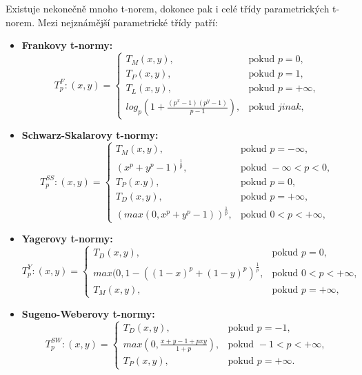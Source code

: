 Existuje nekone\v cn\v e mnoho t-norem, dokonce pak i cel\'e t\v r\'idy parametrick\' ych  t-norem. Mezi nejzn\' am\v ej\v s\' i parametrické třídy patří:
\begin{itemize}
    \item \textbf{Frankovy t-normy:}
    $$T_p^F:(x,y)=\begin{cases} T_M(x,y), & \mbox{pokud }  p = 0,\\ 
                                T_P(x,y), & \mbox{pokud } p = 1,\\
                                T_L(x,y), & \mbox{pokud } p = +\infty,\\
                                log_p(1+\frac{(p^x-1)(p^y-1)}{p-1}), & \mbox{pokud } jinak, 
                                \end{cases}$$
    \item \textbf{Schwarz-Skalarovy t-normy:}
    $$T_p^{SS}:(x,y)=\begin{cases} T_M(x,y), & \mbox{pokud }  p = -\infty,\\ 
                                (x^p+y^p-1)^\frac{1}{p}, & \mbox{pokud }  -\infty < p < 0,\\ 
                                T_P(x.y), & \mbox{pokud } p = 0,\\
                                T_D(x,y), & \mbox{pokud } p = +\infty,\\
                                (max(0, x^p+y^p-1))^\frac{1}{p}, & \mbox{pokud } 0 < p < +\infty, \end{cases}$$
    \item \textbf{Yagerovy t-normy:}
    $$T_p^Y:(x,y)=\begin{cases}  T_D(x,y), & \mbox{pokud } p = 0,\\
                                max(0,1-((1-x)^p+(1-y)^p)^\frac{1}{p} , & \mbox{pokud } 0 < p < +\infty,\\
                                T_M(x,y), & \mbox{pokud } p = +\infty,
                                \end{cases}$$
    \item \textbf{Sugeno-Weberovy t-normy:}
    $$T_p^{SW}:(x,y)=\begin{cases}  T_D(x,y), & \mbox{pokud } p = -1,\\
                                    max(0,\frac{x+y-1+pxy}{1+p}) , & \mbox{pokud } -1 < p < +\infty,\\
                                    T_P(x,y), & \mbox{pokud } p = +\infty.
                                    \end{cases}$$
\end{itemize}

